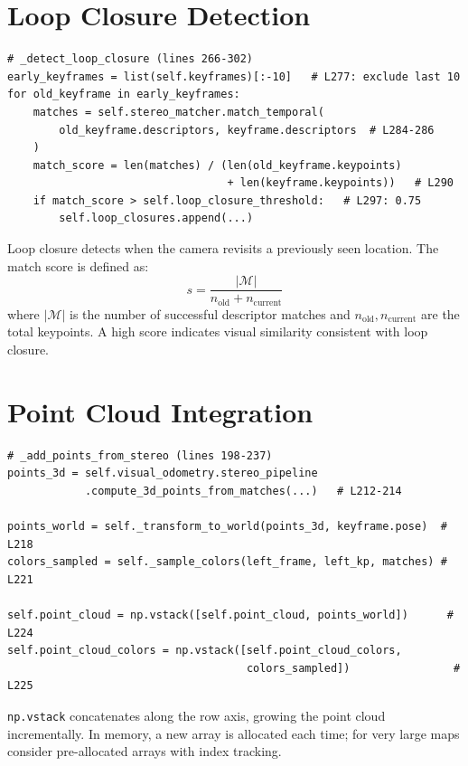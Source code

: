 \documentclass[12pt,a4paper,twoside]{report}
\theoremstyle{definition}
\newcommand{\code}[1]{\texttt{#1}}
\begin{document}
\section{Loop Closure Detection}

\begin{lstlisting}
# _detect_loop_closure (lines 266-302)
early_keyframes = list(self.keyframes)[:-10]   # L277: exclude last 10
for old_keyframe in early_keyframes:
    matches = self.stereo_matcher.match_temporal(
        old_keyframe.descriptors, keyframe.descriptors  # L284-286
    )
    match_score = len(matches) / (len(old_keyframe.keypoints)
                                  + len(keyframe.keypoints))   # L290
    if match_score > self.loop_closure_threshold:   # L297: 0.75
        self.loop_closures.append(...)
\end{lstlisting}

\begin{defbox}
Loop closure detects when the camera revisits a previously seen location.
The match score is defined as:
\[
  s = \frac{|\mathcal{M}|}{n_{\text{old}} + n_{\text{current}}}
\]
where $|\mathcal{M}|$ is the number of successful descriptor matches and
$n_{\text{old}}, n_{\text{current}}$ are the total keypoints. A high score
indicates visual similarity consistent with loop closure.
\end{defbox}

\section{Point Cloud Integration}

\begin{lstlisting}
# _add_points_from_stereo (lines 198-237)
points_3d = self.visual_odometry.stereo_pipeline
            .compute_3d_points_from_matches(...)   # L212-214

points_world = self._transform_to_world(points_3d, keyframe.pose)  # L218
colors_sampled = self._sample_colors(left_frame, left_kp, matches) # L221

self.point_cloud = np.vstack([self.point_cloud, points_world])      # L224
self.point_cloud_colors = np.vstack([self.point_cloud_colors,
                                     colors_sampled])                # L225
\end{lstlisting}

\noindent \code{np.vstack} concatenates along the row axis, growing the point
cloud incrementally. In memory, a new array is allocated each time; for
very large maps consider pre-allocated arrays with index tracking.
\end{document}
